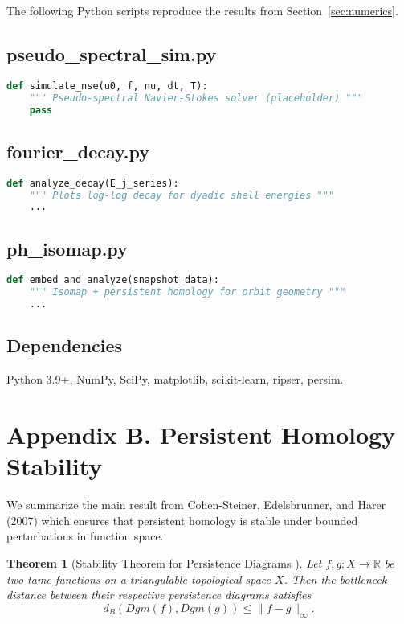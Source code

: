 \documentclass[11pt]{article}
\newtheorem{theorem}{Theorem}[section]
\theoremstyle{definition}
\begin{document}
The following Python scripts reproduce the results from Section~\ref{sec:numerics}.

\subsection*{pseudo\_spectral\_sim.py}
\begin{lstlisting}[language=Python]
def simulate_nse(u0, f, nu, dt, T):
    """ Pseudo-spectral Navier-Stokes solver (placeholder) """
    pass
\end{lstlisting}

\subsection*{fourier\_decay.py}
\begin{lstlisting}[language=Python]
def analyze_decay(E_j_series):
    """ Plots log-log decay for dyadic shell energies """
    ...
\end{lstlisting}

\subsection*{ph\_isomap.py}
\begin{lstlisting}[language=Python]
def embed_and_analyze(snapshot_data):
    """ Isomap + persistent homology for orbit geometry """
    ...
\end{lstlisting}

\subsection*{Dependencies}
Python 3.9+, NumPy, SciPy, matplotlib, scikit-learn, ripser, persim.

\section{Appendix B. Persistent Homology Stability}
\label{sec:appendixB}

We summarize the main result from Cohen-Steiner, Edelsbrunner, and Harer (2007) which ensures that persistent homology is stable under bounded perturbations in function space.

\begin{theorem}[Stability Theorem for Persistence Diagrams \cite{CohenSteiner2007}]
Let $f, g : X \to \mathbb{R}$ be two tame functions on a triangulable topological space $X$. Then the bottleneck distance between their respective persistence diagrams satisfies
\[
d_B(Dgm(f), Dgm(g)) \le \|f - g\|_\infty.
\]
\end{theorem}
\end{document}
